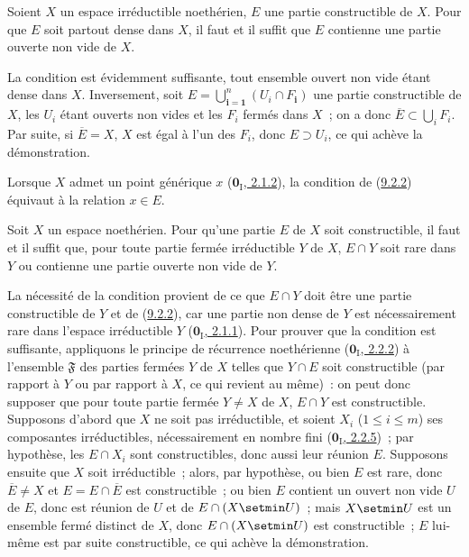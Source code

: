 \begin{proposition}[9.2.2]
\label{0.9.2.2-fr}
Soient $X$ un espace irréductible noethérien, $E$ une partie constructible de
$X$. Pour que $E$ soit partout dense dans $X$, il faut et il suffit que $E$
contienne une partie ouverte non vide de $X$.
\end{proposition}

La condition est évidemment suffisante, tout ensemble ouvert non vide étant
dense dans $X$. Inversement, soit
$E=\bigcup_{\boldsymbol{i}=\mathbf{1}}^n(U_i\cap F_{\boldsymbol{i}})$ une partie constructible de $X$, les $U_i$
étant ouverts non vides et les $F_i$ fermés dans $X$~; on a donc
$\overline{E}\subset\bigcup_i F_i$. Par suite, si $\overline{E}=X$, $X$ est
égal à l'un des $F_i$, donc $E\supset U_i$, ce qui achève la démonstration.

Lorsque $X$ admet un point générique $x$
(\hyperref[0.2.1.2-fr]{$\mathbf{0}_{\mathrm I}$, 2.1.2}), la condition de
(\hyperref[0.9.2.2-fr]{9.2.2}) équivaut à la relation $x\in E$.

\begin{proposition}[9.2.3]
\label{0.9.2.3-fr}
Soit $X$ un espace noethérien. Pour qu'une partie $E$ de $X$ soit
constructible, il faut et il suffit que, pour toute partie fermée
irréductible $Y$ de $X$, $E\cap Y$ soit rare dans $Y$ ou contienne une partie
ouverte non vide de $Y$.
\end{proposition}

La nécessité de la condition provient de ce que $E\cap Y$ doit être une
partie constructible de $Y$ et de (\hyperref[0.9.2.2-fr]{9.2.2}), car une
partie non dense de $Y$ est nécessairement rare dans l'espace irréductible
$Y$ (\hyperref[0.2.1.1-fr]{$\mathbf{0}_{\mathrm I}$, 2.1.1}). Pour prouver que la
condition est suffisante, appliquons le principe de récurrence noethérienne
(\hyperref[0.2.2.2-fr]{$\mathbf{0}_{\mathrm I}$, 2.2.2}) à l'ensemble
$\mathfrak{F}$ des parties fermées $Y$ de $X$ telles que $Y\cap E$ soit
constructible (par rapport à $Y$ ou par rapport à $X$, ce qui revient au
même)~: on peut donc supposer que pour toute partie fermée $Y\ne X$ de $X$,
$E\cap Y$ est constructible. Supposons d'abord que $X$ ne soit pas
irréductible, et soient $X_i$ ($1\leq i\leq m$) ses composantes
irréductibles, nécessairement en nombre fini
(\hyperref[0.2.2.5-fr]{$\mathbf{0}_{\mathrm I}$, 2.2.5})~; par hypothèse, les
$E\cap X_i$ sont constructibles, donc aussi leur réunion $E$. Supposons
ensuite que $X$ soit irréductible~; alors, par hypothèse, ou bien $E$ est
rare, donc $\overline{E}\ne X$ et $E=E\cap\overline{E}$ est constructible~;
ou bien $E$ contient un ouvert non vide $U$ de $E$, donc est réunion de $U$
et de $E\cap(X\setmin U)$~; mais $X\setmin U$ est un ensemble fermé
distinct de $X$, donc $E\cap(X\setmin U)$ est constructible~; $E$
lui-même est par suite constructible, ce qui achève la démonstration.

